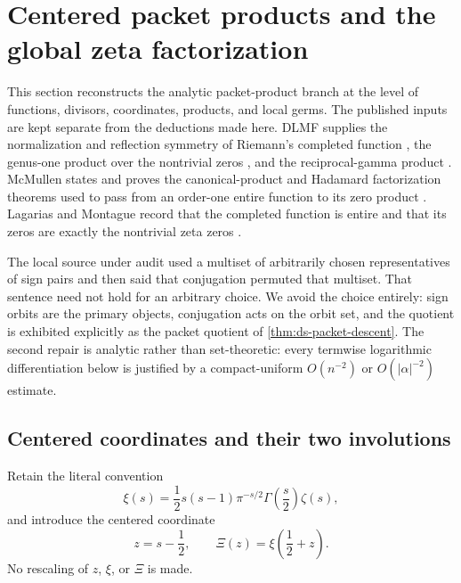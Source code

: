 \section{Centered packet products and the global zeta factorization}
\label{sec:centered-packet-products}

This section reconstructs the analytic packet-product branch at the level of
functions, divisors, coordinates, products, and local germs.  The published
inputs are kept separate from the deductions made here.  DLMF supplies the
normalization and reflection symmetry of Riemann's completed function
\cite[\S25.4, Eqs.~25.4.3--25.4.4]{apostolDLMF25}, the genus-one product over
the nontrivial zeros
\cite[\S25.2(iv), Eq.~25.2.12]{apostolDLMF25}, and the reciprocal-gamma
product
\cite[\S5.8, Eq.~5.8.2]{askeyRoyDLMF5}.  McMullen states and proves the
canonical-product and Hadamard factorization theorems used to pass from an
order-one entire function to its zero product
\cite[Theorems~3.14--3.15, pp.~79--82]{mcMullen2023AdvancedComplex}.
Lagarias and Montague record that the completed function is entire and that
its zeros are exactly the nontrivial zeta zeros
\cite[\S1, Eq.~(1.1) and the following paragraph]{lagariasMontague2011}.

The local source under audit used a multiset of arbitrarily chosen
representatives of sign pairs and then said that conjugation permuted that
multiset.  That sentence need not hold for an arbitrary choice.  We avoid the
choice entirely: sign orbits are the primary objects, conjugation acts on the
orbit set, and the quotient is exhibited explicitly as the packet quotient of
\cref{thm:ds-packet-descent}.  The second repair is analytic rather than
set-theoretic: every termwise logarithmic differentiation below is justified by
a compact-uniform \(O(n^{-2})\) or \(O(|\alpha|^{-2})\) estimate.

\subsection{Centered coordinates and their two involutions}

Retain the literal convention
\begin{equation}
\label{eq:cpp-xi-definition}
 \xi(s)
 =
 \frac12s(s-1)\pi^{-s/2}\Gamma\!\left(\frac{s}{2}\right)\zeta(s),
\end{equation}
and introduce the centered coordinate
\begin{equation}
\label{eq:cpp-centered-definition}
 z=s-\frac12,
 \qquad
 \Xi(z)=\xi\!\left(\frac12+z\right).
\end{equation}
No rescaling of \(z\), \(\xi\), or \(\Xi\) is made.

